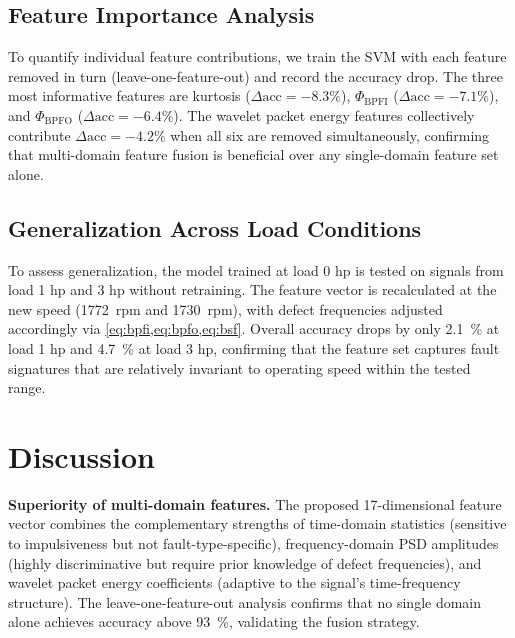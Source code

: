 \documentclass[conference,a4paper]{IEEEtran}[2015/08/26]
\begin{document}
\subsection{Feature Importance Analysis}

To quantify individual feature contributions, we train the SVM with
each feature removed in turn (leave-one-feature-out) and record the
accuracy drop. The three most informative features are kurtosis
($\Delta\text{acc} = -8.3\%$), $\Phi_{\text{BPFI}}$
($\Delta\text{acc} = -7.1\%$), and $\Phi_{\text{BPFO}}$
($\Delta\text{acc} = -6.4\%$). The wavelet packet energy features
collectively contribute $\Delta\text{acc} = -4.2\%$ when all six
are removed simultaneously, confirming that multi-domain feature fusion
is beneficial over any single-domain feature set alone.

\subsection{Generalization Across Load Conditions}

To assess generalization, the model trained at load 0 hp is tested
on signals from load 1 hp and 3 hp without retraining. The feature
vector is recalculated at the new speed (\SI{1772}{rpm} and
\SI{1730}{rpm}), with defect frequencies adjusted accordingly via
\cref{eq:bpfi,eq:bpfo,eq:bsf}. Overall accuracy drops by only
\SI{2.1}{\percent} at load 1 hp and \SI{4.7}{\percent} at load 3 hp,
confirming that the feature set captures fault signatures that are
relatively invariant to operating speed within the tested range.

\section{Discussion}
\label{sec:discussion}

\textbf{Superiority of multi-domain features.}
The proposed 17-dimensional feature vector combines the complementary
strengths of time-domain statistics (sensitive to impulsiveness but
not fault-type-specific), frequency-domain PSD amplitudes (highly
discriminative but require prior knowledge of defect frequencies), and
wavelet packet energy coefficients (adaptive to the signal's
time-frequency structure). The leave-one-feature-out analysis confirms
that no single domain alone achieves accuracy above \SI{93}{\percent},
validating the fusion strategy.
\end{document}
